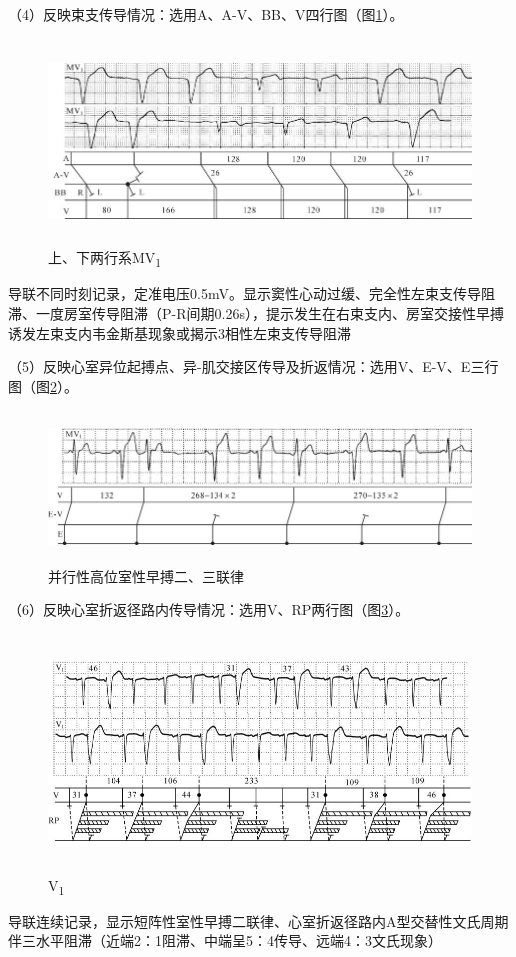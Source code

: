 （4）反映束支传导情况：选用A、A-V、BB、V四行图（图\ref{fig10-4}）。

\begin{figure}[!htbp]
 \centering
 \includegraphics[width=5.82292in,height=2.13542in]{./images/Image00148.jpg}
 \captionsetup{justification=centering}
 \caption{上、下两行系MV\textsubscript{1}}
 \label{fig10-4}
  \end{figure} 
导联不同时刻记录，定准电压0.5mV。显示窦性心动过缓、完全性左束支传导阻滞、一度房室传导阻滞（P-R间期0.26s），提示发生在右束支内、房室交接性早搏诱发左束支内韦金斯基现象或揭示3相性左束支传导阻滞

（5）反映心室异位起搏点、异-肌交接区传导及折返情况：选用V、E-V、E三行图（图\ref{fig10-5}）。

\begin{figure}[!htbp]
 \centering
 \includegraphics[width=5.77083in,height=1.58333in]{./images/Image00149.jpg}
 \captionsetup{justification=centering}
 \caption{并行性高位室性早搏二、三联律}
 \label{fig10-5}
  \end{figure} 

（6）反映心室折返径路内传导情况：选用V、RP两行图（图\ref{fig10-6}）。

\begin{figure}[!htbp]
 \centering
 \includegraphics[width=5.70833in,height=2.46875in]{./images/Image00150.jpg}
 \captionsetup{justification=centering}
 \caption{V\textsubscript{1}}
 \label{fig10-6}
  \end{figure} 
导联连续记录，显示短阵性室性早搏二联律、心室折返径路内A型交替性文氏周期伴三水平阻滞（近端2：1阻滞、中端呈5：4传导、远端4：3文氏现象）

